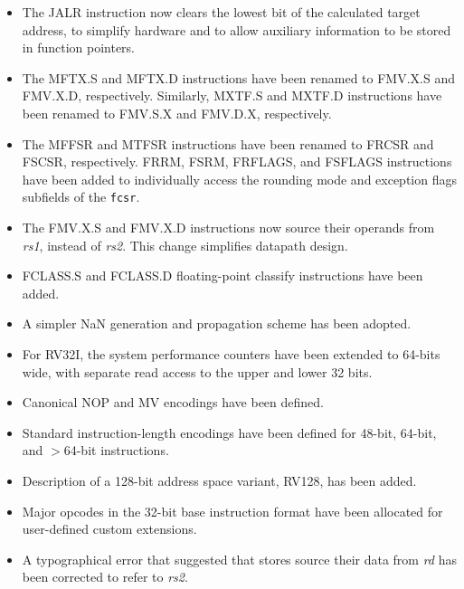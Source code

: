 \begin{itemize}
\item The JALR instruction now clears the lowest bit of the calculated
  target address, to simplify hardware and to allow auxiliary information
  to be stored in function pointers.
\item The MFTX.S and MFTX.D instructions have been renamed to FMV.X.S and
FMV.X.D, respectively.  Similarly, MXTF.S and MXTF.D instructions have been
renamed to FMV.S.X and FMV.D.X, respectively.
\item The MFFSR and MTFSR instructions have been renamed to FRCSR and FSCSR,
respectively.  FRRM, FSRM, FRFLAGS, and FSFLAGS instructions have been added
to individually access the rounding mode and exception flags subfields of
the {\tt fcsr}.
\item The FMV.X.S and FMV.X.D instructions now source their operands
from {\em rs1}, instead of {\em rs2}.  This change simplifies datapath
design.
\item FCLASS.S and FCLASS.D floating-point classify instructions have been
added.
\item A simpler NaN generation and propagation scheme has been
  adopted.
\item For RV32I, the system performance counters have been extended to
  64-bits wide, with separate read access to the upper and lower 32 bits.
\item Canonical NOP and MV encodings have been defined.
\item Standard instruction-length encodings have been defined for 48-bit,
  64-bit, and $>$64-bit instructions.
\item Description of a 128-bit address space variant, RV128, has been added.
\item Major opcodes in the 32-bit base instruction format have been
  allocated for user-defined custom extensions.
\item A typographical error that suggested that stores source their
  data from {\em rd} has been corrected to refer to {\em rs2}.
\end{itemize}
\vspace{-0.1in}
